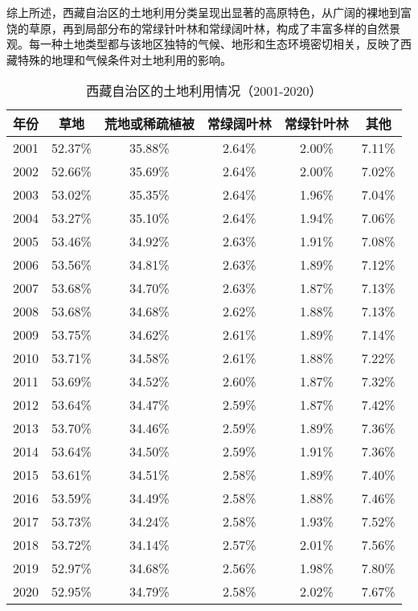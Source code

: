 \documentclass{article}
\begin{document}
		综上所述，西藏自治区的土地利用分类呈现出显著的高原特色，从广阔的裸地到富饶的草原，再到局部分布的常绿针叶林和常绿阔叶林，构成了丰富多样的自然景观。每一种土地类型都与该地区独特的气候、地形和生态环境密切相关，反映了西藏特殊的地理和气候条件对土地利用的影响。
		
		
		\begin{table}[H]
			\centering
			\begin{tabular}{|c|c|c|c|c|c|}
				\hline
				年份 & 草地 & 荒地或稀疏植被 & 常绿阔叶林 & 常绿针叶林 & 其他 \\
				\hline
				2001 & 52.37\% & 35.88\% & 2.64\% & 2.00\% & 7.11\% \\
				2002 & 52.66\% & 35.69\% & 2.64\% & 2.00\% & 7.02\% \\
				2003 & 53.02\% & 35.35\% & 2.64\% & 1.96\% & 7.04\% \\
				2004 & 53.27\% & 35.10\% & 2.64\% & 1.94\% & 7.06\% \\
				2005 & 53.46\% & 34.92\% & 2.63\% & 1.91\% & 7.08\% \\
				2006 & 53.56\% & 34.81\% & 2.63\% & 1.89\% & 7.12\% \\
				2007 & 53.68\% & 34.70\% & 2.63\% & 1.87\% & 7.13\% \\
				2008 & 53.68\% & 34.68\% & 2.62\% & 1.88\% & 7.13\% \\
				2009 & 53.75\% & 34.62\% & 2.61\% & 1.89\% & 7.14\% \\
				2010 & 53.71\% & 34.58\% & 2.61\% & 1.88\% & 7.22\% \\
				2011 & 53.69\% & 34.52\% & 2.60\% & 1.87\% & 7.32\% \\
				2012 & 53.64\% & 34.47\% & 2.59\% & 1.87\% & 7.42\% \\
				2013 & 53.70\% & 34.46\% & 2.59\% & 1.89\% & 7.36\% \\
				2014 & 53.64\% & 34.50\% & 2.59\% & 1.91\% & 7.36\% \\
				2015 & 53.61\% & 34.51\% & 2.58\% & 1.89\% & 7.40\% \\
				2016 & 53.59\% & 34.49\% & 2.58\% & 1.88\% & 7.46\% \\
				2017 & 53.73\% & 34.24\% & 2.58\% & 1.93\% & 7.52\% \\
				2018 & 53.72\% & 34.14\% & 2.57\% & 2.01\% & 7.56\% \\
				2019 & 52.97\% & 34.68\% & 2.56\% & 1.98\% & 7.80\% \\
				2020 & 52.95\% & 34.79\% & 2.58\% & 2.02\% & 7.67\% \\
				\hline
			\end{tabular}
			\caption{西藏自治区的土地利用情况（2001-2020）}
		\end{table}
		
\end{document}
